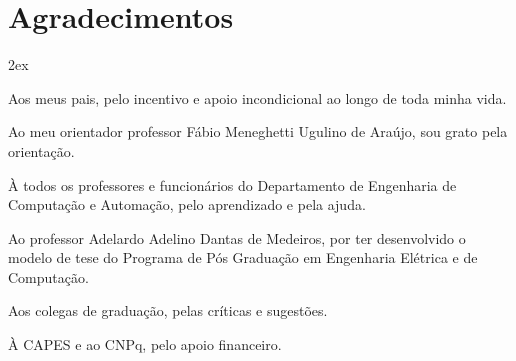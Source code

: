 \chapter*{Agradecimentos}
\thispagestyle{empty}

\begin{trivlist}  \itemsep 2ex

\item Aos meus pais, pelo incentivo e apoio incondicional ao longo de toda minha
vida.

\item Ao meu orientador professor Fábio Meneghetti Ugulino de Araújo, sou grato
pela orientação.

\item À todos os professores e funcionários do Departamento de Engenharia de
Computação e Automação, pelo aprendizado e pela ajuda.

\item Ao professor Adelardo Adelino Dantas de Medeiros, por ter desenvolvido o
modelo de tese do Programa de Pós Graduação em Engenharia Elétrica e de
Computação.

\item Aos colegas de graduação, pelas críticas e sugestões.

\item À CAPES e ao CNPq, pelo apoio financeiro.

\end{trivlist}
